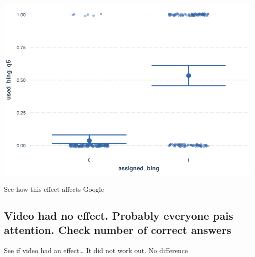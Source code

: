 \documentclass[
  11pt,
]{article}
\newenvironment{Shaded}{\begin{snugshade}}{\end{snugshade}}
\newcommand{\AttributeTok}[1]{\textcolor[rgb]{0.13,0.29,0.53}{#1}}
\newcommand{\CommentTok}[1]{\textcolor[rgb]{0.56,0.35,0.01}{\textit{#1}}}
\newcommand{\DecValTok}[1]{\textcolor[rgb]{0.00,0.00,0.81}{#1}}
\newcommand{\FunctionTok}[1]{\textcolor[rgb]{0.13,0.29,0.53}{\textbf{#1}}}
\newcommand{\NormalTok}[1]{#1}
\newcommand{\OtherTok}[1]{\textcolor[rgb]{0.56,0.35,0.01}{#1}}
\newcommand{\SpecialCharTok}[1]{\textcolor[rgb]{0.81,0.36,0.00}{\textbf{#1}}}
\begin{document}
\includegraphics{analysis-July19_files/figure-latex/unnamed-chunk-17-1.pdf}

See how this effect affects Google

\hypertarget{video-had-no-effect.-probably-everyone-pais-attention.-check-number-of-correct-answers}{%
\subsection{Video had no effect. Probably everyone pais attention. Check number of correct answers}\label{video-had-no-effect.-probably-everyone-pais-attention.-check-number-of-correct-answers}}

See if video had an effect\ldots{} It did not work out. No difference

\begin{Shaded}
\end{Shaded}
\end{document}
